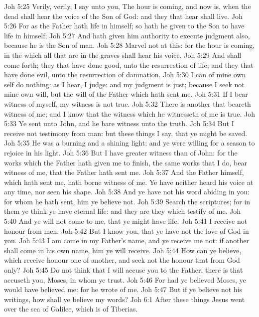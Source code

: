 \vs Joh 5:25 Verily, verily, I say unto you, The hour is coming, and now is, when the dead shall hear the voice of the Son of God: and they that hear shall live.
\vs Joh 5:26 For as the Father hath life in himself; so hath he given to the Son to have life in himself;
\vs Joh 5:27 And hath given him authority to execute judgment also, because he is the Son of man.
\vs Joh 5:28 Marvel not at this: for the hour is coming, in the which all that are in the graves shall hear his voice,
\vs Joh 5:29 And shall come forth; they that have done good, unto the resurrection of life; and they that have done evil, unto the resurrection of damnation.
\vs Joh 5:30 I can of mine own self do nothing: as I hear, I judge: and my judgment is just; because I seek not mine own will, but the will of the Father which hath sent me.
\vs Joh 5:31 If I bear witness of myself, my witness is not true.
\vs Joh 5:32 There is another that beareth witness of me; and I know that the witness which he witnesseth of me is true.
\vs Joh 5:33 Ye sent unto John, and he bare witness unto the truth.
\vs Joh 5:34 But I receive not testimony from man: but these things I say, that ye might be saved.
\vs Joh 5:35 He was a burning and a shining light: and ye were willing for a season to rejoice in his light.
\vs Joh 5:36 But I have greater witness than  of John: for the works which the Father hath given me to finish, the same works that I do, bear witness of me, that the Father hath sent me.
\vs Joh 5:37 And the Father himself, which hath sent me, hath borne witness of me. Ye have neither heard his voice at any time, nor seen his shape.
\vs Joh 5:38 And ye have not his word abiding in you: for whom he hath sent, him ye believe not.
\vs Joh 5:39 Search the scriptures; for in them ye think ye have eternal life: and they are they which testify of me.
\vs Joh 5:40 And ye will not come to me, that ye might have life.
\vs Joh 5:41 I receive not honour from men.
\vs Joh 5:42 But I know you, that ye have not the love of God in you.
\vs Joh 5:43 I am come in my Father's name, and ye receive me not: if another shall come in his own name, him ye will receive.
\vs Joh 5:44 How can ye believe, which receive honour one of another, and seek not the honour that  from God only?
\vs Joh 5:45 Do not think that I will accuse you to the Father: there is  that accuseth you,  Moses, in whom ye trust.
\vs Joh 5:46 For had ye believed Moses, ye would have believed me: for he wrote of me.
\vs Joh 5:47 But if ye believe not his writings, how shall ye believe my words?
\vs Joh 6:1 After these things Jesus went over the sea of Galilee, which is  of Tiberias.
